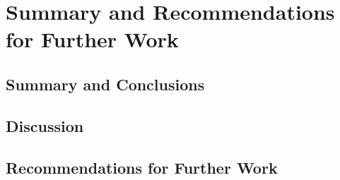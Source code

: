 \chapter[Summary]{Summary and Recommendations for Further Work}

\section{Summary and Conclusions}

\section{Discussion}
\section{Recommendations for Further Work}
